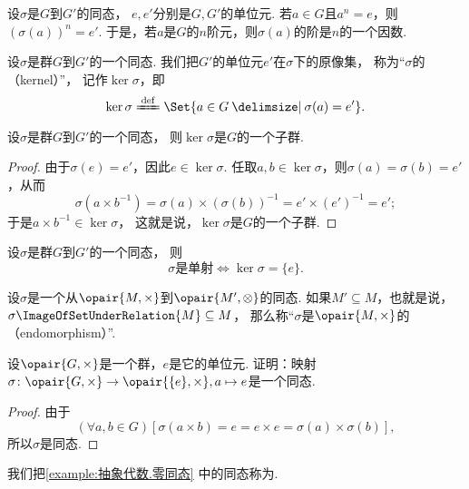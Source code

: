 \begin{property}
设\(\sigma\)是\(G\)到\(G'\)的同态，
\(e,e'\)分别是\(G,G'\)的单位元.
若\(a \in G\)且\(a^n = e\)，则\((\sigma(a))^n = e'\).
于是，若\(a\)是\(G\)的\(n\)阶元，则\(\sigma(a)\)的阶是\(n\)的一个因数.
\end{property}

\begin{definition}
设\(\sigma\)是群\(G\)到\(G'\)的一个同态.
我们把\(G'\)的单位元\(e'\)在\(\sigma\)下的原像集，
称为“\(\sigma\)的（kernel）”，
记作\(\ker\sigma\)，即\[
	\ker\sigma \defeq \Set{ a \in G \given \sigma(a) = e' }.
\]
\end{definition}

\begin{proposition}
设\(\sigma\)是群\(G\)到\(G'\)的一个同态，
则\(\ker\sigma\)是\(G\)的一个子群.
\begin{proof}
由于\(\sigma(e)=e'\)，因此\(e\in\ker\sigma\).
任取\(a,b\in\ker\sigma\)，则\(\sigma(a)=\sigma(b)=e'\)，从而\[
	\sigma(a \times b^{-1}) = \sigma(a) \times (\sigma(b))^{-1}
	= e' \times (e')^{-1}
	= e';
\]
于是\(a \times b^{-1} \in \ker\sigma\)，
这就是说，\(\ker\sigma\)是\(G\)的一个子群.
\end{proof}
\end{proposition}

\begin{proposition}
设\(\sigma\)是群\(G\)到\(G'\)的一个同态，
则\[
	\text{\(\sigma\)是单射}
	\iff
	\ker\sigma=\{e\}.
\]
\end{proposition}


\begin{definition}
设\(\sigma\)是一个从\(\opair{M,\times}\)到\(\opair{M',\otimes}\)的同态.
如果\(M' \subseteq M\)，也就是说，\(\sigma\ImageOfSetUnderRelation{M}\subseteq M\)，
那么称“\(\sigma\)是\(\opair{M,\times}\)的（endomorphism）”.
\end{definition}

\begin{example}\label{example:抽象代数.零同态}
设\(\opair{G,\times}\)是一个群，\(e\)是它的单位元.
证明：映射\(\sigma\colon\opair{G,\times}\to\opair{\{e\},\times},a\mapsto e\)是一个同态.
\begin{proof}
由于\[
	(\forall a,b\in G)[
		\sigma(a \times b)
		= e
		= e \times e
		= \sigma(a) \times \sigma(b)
	],
\]
所以\(\sigma\)是同态.
\end{proof}
\end{example}
我们把\cref{example:抽象代数.零同态} 中的同态称为.

